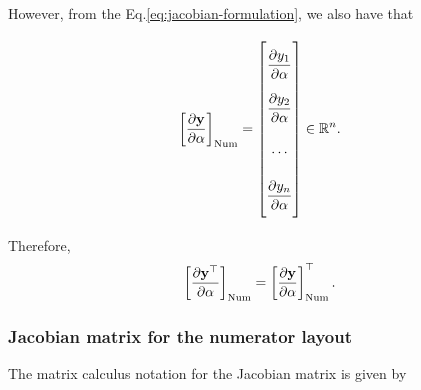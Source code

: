 \documentclass{article}
\begin{document}
However, from the Eq.\eqref{eq:jacobian-formulation}, we also have that

\begin{align}
    \left[\dfrac{\partial \mathbf{y}}{\partial \alpha}\right]_{\textnormal{Num}} = \renewcommand{\arraystretch}{2.6}\begin{bmatrix}
        \dfrac{\partial y_{1}}{\partial \alpha} \\
        \dfrac{\partial y_{2}}{\partial \alpha} \\
        \cdots \\
        \dfrac{\partial y_{n}}{\partial \alpha}\vspace{1.3ex}
    \end{bmatrix} \in \mathbb{R}^{n}.
\end{align}

Therefore,
\begin{align}
    \left[\dfrac{\partial \mathbf{y}^\top}{\partial \alpha}\right]_{\textnormal{Num}} = \left[\dfrac{\partial \mathbf{y}}{\partial \alpha}\right]_{\textnormal{Num}}^\top.
\end{align}

\subsubsection{Jacobian matrix for the numerator layout}
The matrix calculus notation for the Jacobian matrix is given by
\end{document}
